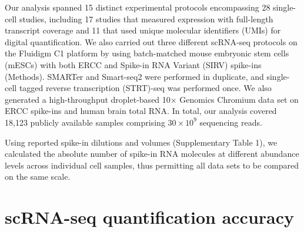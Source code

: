 Our analysis spanned 15 distinct experimental protocols encompassing 28 single-cell studies, including 17 studies that measured expression with full-length transcript coverage and 11 that used unique molecular identifiers (UMIs) for digital quantification. We also carried out three different scRNA-seq protocols on the Fluidigm C1 platform by using batch-matched mouse embryonic stem cells (mESCs) with both ERCC and Spike-in RNA Variant (SIRV) spike-ins (Methods). SMARTer and Smart-seq2 were performed in duplicate, and single-cell tagged reverse transcription (STRT)-seq was performed once. We also generated a high-throughput droplet-based 10× Genomics Chromium data set on ERCC spike-ins and human brain total RNA. In total, our analysis covered 18,123 publicly available samples comprising \( 30 \times 10^9 \) sequencing reads.

Using reported spike-in dilutions and volumes (Supplementary Table 1), we calculated the absolute number of spike-in RNA molecules at different abundance levels across individual cell samples, thus permitting all data sets to be compared on the same scale.

\section{scRNA-seq quantification accuracy}

